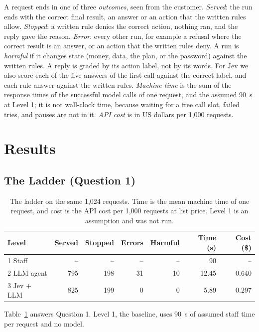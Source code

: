 \documentclass[sigconf,nonacm]{acmart}
\begin{document}
A request ends in one of three \emph{outcomes}, seen from the customer. \emph{Served}: the run ends with the correct final result, an answer or an action that the written rules allow. \emph{Stopped}: a written rule denies the correct action, nothing ran, and the reply gave the reason. \emph{Error}: every other run, for example a refusal where the correct result is an answer, or an action that the written rules deny. A run is \emph{harmful} if it changes state (money, data, the plan, or the password) against the written rules. A reply is graded by its action label, not by its words. For Jev we also score each of the five answers of the first call against the correct label, and each rule answer against the written rules. \emph{Machine time} is the sum of the response times of the successful model calls of one request, and the assumed 90~s at Level 1; it is not wall-clock time, because waiting for a free call slot, failed tries, and pauses are not in it. \emph{API cost} is in US dollars per 1,000 requests.

\section{Results}\label{sec:results}

\subsection{The Ladder (Question 1)}

\begin{table}[t]
\caption{The ladder on the same 1,024 requests. Time is the mean machine time of one request, and cost is the API cost per 1,000 requests at list price. Level 1 is an assumption and was not run.}
\label{tab:ladder}
\footnotesize
\setlength{\tabcolsep}{3pt}
\begin{tabular}{@{}lrrrrrr@{}}
\toprule
Level & Served & Stopped & Errors & Harmful & Time (s) & Cost (\$) \\
\midrule
1 Staff & -- & -- & -- & -- & 90 & -- \\
2 LLM agent & 795 & 198 & 31 & 10 & 12.45 & 0.640 \\
3 Jev + LLM & 825 & 199 & 0 & 0 & 5.89 & 0.297 \\
\bottomrule
\end{tabular}
\end{table}

Table~\ref{tab:ladder} answers Question 1. Level 1, the baseline, uses 90~s of assumed staff time per request and no model.
\end{document}
